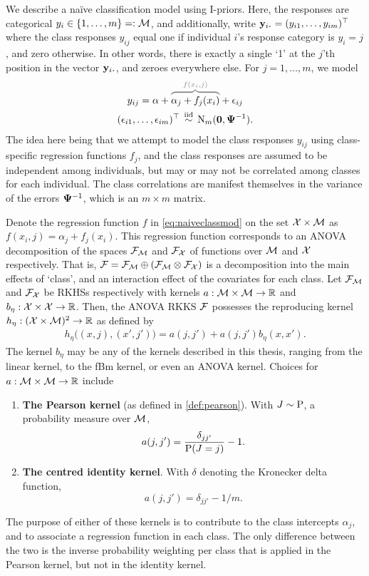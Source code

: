 We describe a naïve classification model using I-priors.
Here, the responses are categorical $y_i \in \{ 1,\dots,m \} =: {\mathcal M}$, and additionally, write $\by_{i \bigcdot} = (y_{i1},\dots,y_{im})^\top$ where the class responses $y_{ij}$ equal one if individual $i$'s response category is $y_i = j$, and zero otherwise.
In other words, there is exactly a single `1' at the $j$'th position in the vector $\by_{i \bigcdot}$, and zeroes everywhere else.
For $j=1,\dots,m$, we model 
\begin{equation}\label{eq:naiveclassmod}
  \begin{gathered}
    y_{ij} = \alpha + 
    \myoverbrace{\alpha_j + f_j(x_i)}{f(x_i,j)}
    + \epsilon_{ij}  \\
    (\epsilon_{i1},\dots,\epsilon_{im})^\top \iid \N_m(\bzero,\bPsi^{-1}).
  \end{gathered}
\end{equation}
The idea here being that we attempt to model the class responses $y_{ij}$ using class-specific regression functions $f_j$, and the class responses are assumed to be independent among individuals, but may or may not be correlated among classes for each individual.
The class correlations are manifest themselves in the variance of the errors ${\bm\Psi}^{-1}$, which is an $m\times m$ matrix.

Denote the regression function $f$ in \cref{eq:naiveclassmod} on the set ${\mathcal X}\times{\mathcal M}$ as $f(x_i,j) = \alpha_j + f_j(x_i)$.
This regression function corresponds to an ANOVA decomposition of the spaces ${\mathcal F}_{\mathcal M}$ and ${\mathcal F}_{\mathcal X}$ of functions over ${\mathcal M}$ and ${\mathcal X}$ respectively. 
That is, ${\mathcal F} = {\mathcal F}_{\mathcal M} \oplus ({\mathcal F}_{\mathcal M} \otimes {\mathcal F}_{\mathcal X})$ is a decomposition into the main effects of `class', and an interaction effect of the covariates for each class.
Let ${\mathcal F}_{\mathcal M}$ and ${\mathcal F}_{\mathcal X}$ be RKHSs respectively with kernels $a:{\mathcal M}\times{\mathcal M}\to\mathbb{R}$ and $b_\eta:{\mathcal X}\times{\mathcal X}\to\mathbb{R}$.
Then, the ANOVA RKKS ${\mathcal F}$ possesses the reproducing kernel $h_\eta:({\mathcal X} \times {\mathcal M})^2 \to \mathbb{R}$ as defined by
\begin{align}\label{eq:anovaclass}
  h_\eta\big( (x,j), (x',j') \big) = a(j,j') + a(j,j')b_\eta(x,x').  
\end{align}
The kernel $b_\eta$ may be any of the kernels described in this thesis, ranging from the linear kernel, to the fBm kernel, or even an ANOVA kernel.
Choices for $a:{\mathcal M} \times {\mathcal M} \to \mathbb{R}$ include 
\begin{enumerate}
  \item \textbf{The Pearson kernel} (as defined in \cref{def:pearson}). With $J\sim\operatorname{P}$, a probability measure over ${\mathcal M}$,
  \[
    a(j,j') = \frac{\delta_{jj'}}{\operatorname{P}(J=j)} - 1.
  \]
  \item \textbf{The centred identity kernel}. With $\delta$ denoting the Kronecker delta function,
  \[
    a(j,j') = \delta_{jj'} - 1 / m.
  \]
\end{enumerate}
The purpose of either of these kernels is to contribute to the class intercepts $\alpha_j$, and to associate a regression function in each class.
The only difference between the two is the inverse probability weighting per class that is applied in the Pearson kernel, but not in the identity kernel.


